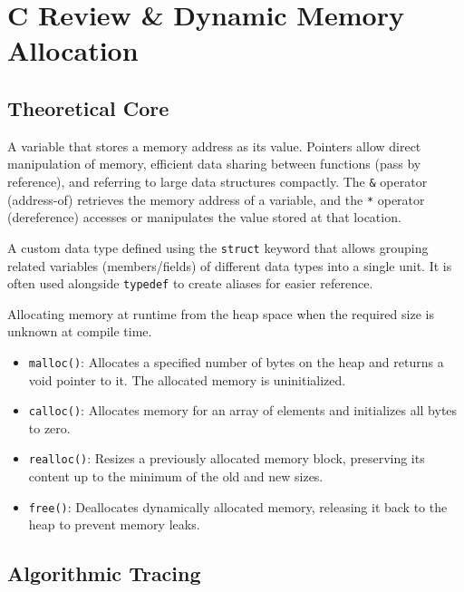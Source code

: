 \chapter{C Review \& Dynamic Memory Allocation}

\section{Theoretical Core}

\begin{definition}[Pointers]
A variable that stores a memory address as its value. Pointers allow direct manipulation of memory, efficient data sharing between functions (pass by reference), and referring to large data structures compactly. The \texttt{\&} operator (address-of) retrieves the memory address of a variable, and the \texttt{*} operator (dereference) accesses or manipulates the value stored at that location.
\end{definition}

\begin{definition}[Structs]
A custom data type defined using the \texttt{struct} keyword that allows grouping related variables (members/fields) of different data types into a single unit. It is often used alongside \texttt{typedef} to create aliases for easier reference.
\end{definition}

\begin{definition}
Allocating memory at runtime from the heap space when the required size is unknown at compile time.
\begin{itemize}
    \item \texttt{malloc()}: Allocates a specified number of bytes on the heap and returns a void pointer to it. The allocated memory is uninitialized.
    \item \texttt{calloc()}: Allocates memory for an array of elements and initializes all bytes to zero.
    \item \texttt{realloc()}: Resizes a previously allocated memory block, preserving its content up to the minimum of the old and new sizes.
    \item \texttt{free()}: Deallocates dynamically allocated memory, releasing it back to the heap to prevent memory leaks.
\end{itemize}
\end{definition}

\newpage
\section{Algorithmic Tracing}

